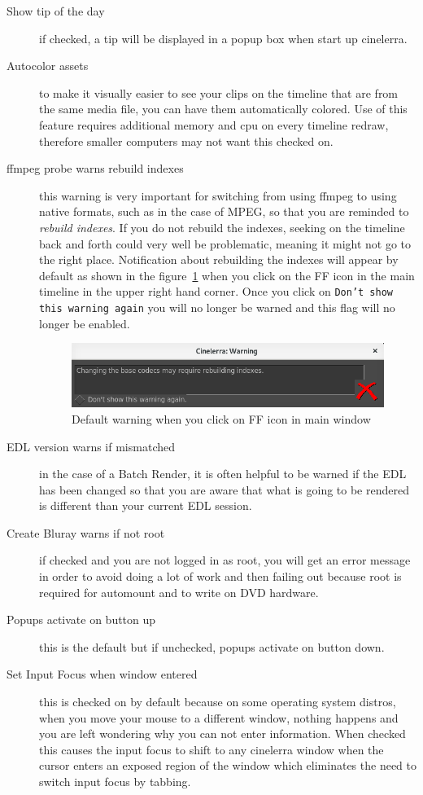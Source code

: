 \begin{description}
    \item[Show tip of the day] if checked, a tip will be displayed in a popup box when start up cinelerra.
    \item[Autocolor assets] to make it visually easier to see your clips on the timeline that are from the same media file, you can have them automatically colored. Use of this feature requires additional memory and cpu on every timeline redraw, therefore smaller computers may not want this checked on.
    \item[ffmpeg probe warns rebuild indexes] this warning is very important for switching from using ffmpeg to using native formats, such as in the case of MPEG, so that you are reminded to \textit{rebuild indexes}.  If you do not rebuild the indexes, seeking on the timeline back and forth could very well be problematic, meaning it might not go to the right place.  Notification about rebuilding the indexes will appear by default as shown in the figure~\ref{fig:ff_probe} when you click on the FF icon in the main timeline in the upper right hand corner.  Once you click on \texttt{Don’t show this warning again} you will no longer be warned and this flag will no longer be enabled.
    \begin{figure}[htpb]
        \centering \includegraphics[width=0.7\linewidth]{images/ff_probe.png}
        \caption{Default warning when you click on FF icon in main window}
        \label{fig:ff_probe}
    \end{figure}
    \item[EDL version warns if mismatched] in the case of a Batch Render, it is often helpful to be warned if the EDL has been changed so that you are aware that what is going to be rendered is different than your current EDL session.
    \item[Create Bluray warns if not root] if checked and you are not logged in as root, you will get an error message in order to avoid doing a lot of work and then failing out because root is required for automount and to write on DVD hardware.
    \item[Popups activate on button up] this is the default but if unchecked, popups activate on button down.
    \item[Set Input Focus when window entered] this is checked on by default because on some operating system distros, when you move your mouse to a different window, nothing happens and you are left wondering why you can not enter information.  When checked this causes the input focus to shift to any cinelerra window when the cursor enters an exposed region of the window which eliminates the need to switch input focus by tabbing. 

\end{description}
